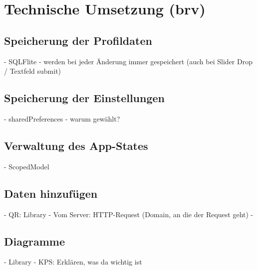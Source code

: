 \chapter{Technische Umsetzung (brv)}
\label{chap:technUmsetzung}

	\section{Speicherung der Profildaten}
	\label{sec:speicherungProfildaten}
	
	 - SQLFlite
	 - werden bei jeder Änderung immer gespeichert (auch bei Slider Drop / Textfeld submit)
	
	\section{Speicherung der Einstellungen}
	\label{sec:speicherungEinstellungen}
	
	- sharedPreferences
	- warum gewählt?
	
	\section{Verwaltung des App-States}
	\label{}
	
	- ScopedModel
	
	\section{Daten hinzufügen}
	\label{}
	
	- QR: Library
	- Vom Server: HTTP-Request (Domain, an die der Request geht)
	- 
	
	
	\section{Diagramme}
	\label{}
	
	- Library
	- KPS: Erklären, was da wichtig ist
	
	\section{}
	\label{}
	
	\section{}
	\label{}
	
	\section{}
	\label{}
	
	\section{}
	\label{}
	
	\section{}
	\label{}